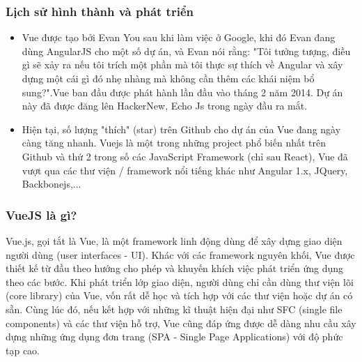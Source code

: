 \documentclass[12pt,a4paper]{report}
\begin{document}
\subsubsection{Lịch sử hình thành và phát triển}
\begin{itemize}
	\item Vue được tạo bởi Evan You sau khi làm việc ở Google, khi đó Evan đang dùng AngularJS cho một số dự án, và Evan nói rằng: "Tôi tưởng tượng, điều gì sẽ xảy ra nếu tôi trích một phần mà tôi thực sự thích về Angular và xây dựng một cái gì đó nhẹ nhàng mà không cần thêm các khái niệm bổ sung?".Vue ban đầu được phát hành lần đầu vào tháng 2 năm 2014. Dự án này đã được đăng lên HackerNew, Echo Js trong ngày đầu ra mắt.
	\item Hiện tại, số lượng "thích" (star) trên Github cho dự án của Vue đang ngày càng tăng nhanh. Vuejs là một trong những project phổ biến nhất trên Github và thứ 2 trong số các JavaScript Framework (chỉ sau React), Vue đã vượt qua các thư viện / framework nổi tiếng khác như Angular 1.x, JQuery, Backbonejs,...
\end{itemize}
\subsubsection{VueJS là gì?}
Vue.js, gọi tắt là Vue, là một framework linh động dùng để xây dựng giao diện người dùng (user interfaces - UI). Khác với các framework nguyên khối, Vue được thiết kế từ đầu theo hướng cho phép và khuyến khích việc phát triển ứng dụng theo các bước. Khi phát triển lớp giao diện, người dùng chỉ cần dùng thư viện lõi (core library) của Vue, vốn rất dễ học và tích hợp với các thư viện hoặc dự án có sẵn. Cùng lúc đó, nếu kết hợp với những kĩ thuật hiện đại như SFC (single file components) và các thư viện hỗ trợ, Vue cũng đáp ứng được dễ dàng nhu cầu xây dựng những ứng dụng đơn trang (SPA - Single Page Applications) với độ phức tạp cao.
\end{document}
